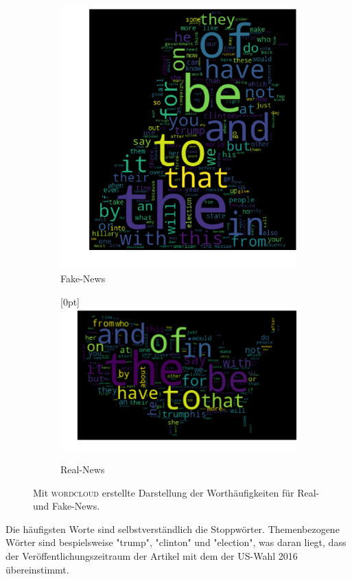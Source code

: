 \begin{figure}[t!]
    \centering
    \begin{subfigure}[t]{0.45\textwidth}
        \centering
        \includegraphics[width=\textwidth]{pictures/fake_wordcloud.pdf}
        \caption{Fake-News}
    \end{subfigure}
    \begin{subfigure}[t]{0.54\textwidth}
        \centering
        \raisebox{1.5cm}[0pt]{\includegraphics[width=\textwidth]{pictures/real_wordcloud.pdf}}
        \caption{Real-News}
    \end{subfigure}
    \caption{Mit \textsc{wordcloud} \cite{wordcloud} erstellte Darstellung der Worthäufigkeiten für Real- und Fake-News.}
    \label{fig:wordcloud}
\end{figure}
Die häufigsten Worte sind selbstverständlich die Stoppwörter.
Themenbezogene Wörter sind bespielsweise "trump", "clinton" und "election", was daran liegt, dass der Veröffentlichungszeitraum 
der Artikel mit dem der US-Wahl 2016 übereinstimmt. 

